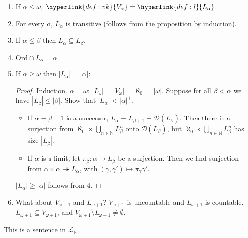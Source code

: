\documentclass{article}
\newcommand{\named}[1]{\textbf{#1}\index{#1}}
\newcommand{\1}{\mathbbm{1}}
\begin{document}
\begin{enumerate}
  \item If $\alpha \leq \omega$, $\hyperlink{def:vk}{V_\alpha} = \hyperlink{def:l}{L_\alpha}$.
  \item For every $\alpha$, $L_\alpha$ is \hyperlink{def:transitive}{transitive} (follows from the proposition by induction).
  \item If $\alpha \leq \beta$ then $L_\alpha \subseteq L_\beta$.
  \item $\text{Ord} \cap L_\alpha = \alpha$.
  \item If $\alpha \geq \omega$ then $|L_\alpha| = |\alpha|$:
    \begin{proof}
      Induction. $\alpha=\omega$: $|L_\omega| = |V_\omega| = \aleph_0 = |\omega|$.
      Suppose for all $\beta < \alpha$ we have $|L_\beta| \leq |\beta|$.
      Show that $|L_\alpha| < |\alpha|^+$.
      \begin{itemize}
        \item If $\alpha=\beta+1$ is a successor, $L_\alpha = L_{\beta+1} = \mathcal{D}(L_\beta)$.
          Then there is a surjection from $\aleph_0 \times \bigcup_{n \in \mathbb{N}} L_\beta^n$ onto $\mathcal{D}(L_\beta)$, but $\aleph_0 \times \bigcup_{n \in \mathbb{N}} L_\beta^n$ has size $|L_\beta|$.
        \item If $\alpha$ is a limit, let $\pi_\beta: \alpha \to L_\beta$ be a surjection. Then we find surjection from $\alpha \times \alpha \twoheadrightarrow L_\alpha$, with $(\gamma,\gamma') \mapsto \pi_\gamma \gamma'$.
      \end{itemize}
      $|L_\alpha| \geq |\alpha|$ follows from 4.
    \end{proof}
  \item What about $V_{\omega+1}$ and $L_{\omega+1}$? $V_{\omega+1}$ is uncountable and $L_{\omega+1}$ is countable. $L_{\omega+1} \subseteq V_{\omega+1}$, and $V_{\omega+1} \setminus L_{\omega+1} \neq \emptyset$.
\end{enumerate}
This is a sentence in $\mathcal{L}_\in$.
\end{document}
